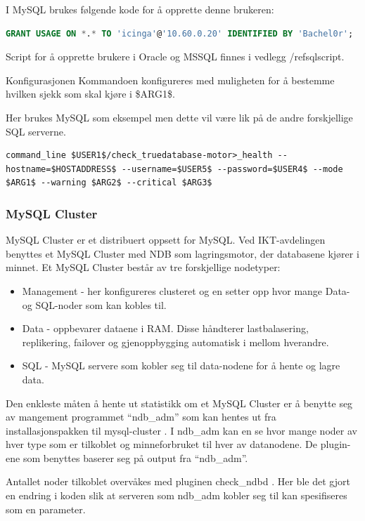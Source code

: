 I MySQL brukes følgende kode for å opprette denne brukeren:
\begin{lstlisting}[language=SQL]
GRANT USAGE ON *.* TO 'icinga'@'10.60.0.20' IDENTIFIED BY 'Bachel0r'; 
\end{lstlisting}

Script for å opprette brukere i Oracle og MSSQL finnes i vedlegg /ref{sqlscript}.

Konfigurasjonen
Kommandoen konfigureres med muligheten for å bestemme hvilken sjekk som skal kjøre i \$ARG1\$.

Her brukes MySQL som eksempel men dette vil være lik på de andre forskjellige SQL serverne. 
\begin{lstlisting}
command_line $USER1$/check_truedatabase-motor>_health --hostname=$HOSTADDRESS$ --username=$USER5$ --password=$USER4$ --mode $ARG1$ --warning $ARG2$ --critical $ARG3$
\end{lstlisting}
\subsubsection{MySQL Cluster}

MySQL Cluster er et distribuert oppsett for MySQL. Ved IKT-avdelingen benyttes et MySQL Cluster med NDB som lagringsmotor, der databasene kjører i minnet. Et MySQL Cluster består av tre forskjellige nodetyper:

\begin{itemize}
	\item Management - her konfigureres clusteret og en setter opp hvor mange Data- og SQL-noder som kan kobles til.
	\item Data - oppbevarer dataene i RAM. Disse håndterer lastbalasering, replikering, failover og gjenoppbygging automatisk i mellom hverandre.
	\item SQL - MySQL servere som kobler seg til data-nodene for å hente og lagre data.
\end{itemize}

Den enkleste måten å hente ut statistikk om et MySQL Cluster er å benytte seg av mangement programmet “ndb\_adm” som kan hentes ut fra installasjonspakken til mysql-cluster \cite{ndbdownload}. I ndb\_adm kan en se hvor mange noder av hver type som er tilkoblet og minneforbruket til hver av datanodene. De plugin-ene som benyttes baserer seg på output fra “ndb\_adm”.

Antallet noder tilkoblet overvåkes med pluginen check\_ndbd \cite{ndbnode}. Her ble det gjort en endring i koden slik at serveren som ndb\_adm kobler seg til kan spesifiseres som en parameter.

